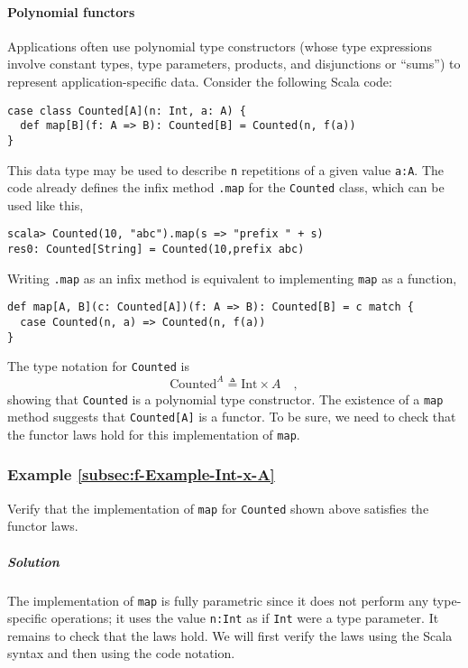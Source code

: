 \paragraph{Polynomial functors}

Applications often use polynomial type constructors
(whose type expressions involve constant types, type parameters, products,
and disjunctions or ``sums'') to represent application-specific
data. Consider the following Scala code:
\begin{lstlisting}
case class Counted[A](n: Int, a: A) {
  def map[B](f: A => B): Counted[B] = Counted(n, f(a))
}
\end{lstlisting}
This data type may be used to describe \lstinline!n! repetitions
of a given value \lstinline!a:A!. The code already defines the infix
method \lstinline!.map! for the \lstinline!Counted! class, which
can be used like this,
\begin{lstlisting}
scala> Counted(10, "abc").map(s => "prefix " + s)
res0: Counted[String] = Counted(10,prefix abc) 
\end{lstlisting}
Writing \lstinline!.map! as an infix method is equivalent to implementing
\lstinline!map! as a function,
\begin{lstlisting}
def map[A, B](c: Counted[A])(f: A => B): Counted[B] = c match {
  case Counted(n, a) => Counted(n, f(a))
}
\end{lstlisting}
The type notation for \lstinline!Counted! is
\[
\text{Counted}^{A}\triangleq\text{Int}\times A\quad,
\]
showing that \lstinline!Counted! is a polynomial
type constructor. The existence of a \lstinline!map! method suggests
that \lstinline!Counted[A]! is a functor. To be sure, we need to
check that the functor laws hold for this implementation of \lstinline!map!.

\subsubsection{Example \label{subsec:f-Example-Int-x-A}\ref{subsec:f-Example-Int-x-A}}

Verify that the implementation of \lstinline!map! for \lstinline!Counted!
shown above satisfies the functor laws. 

\subparagraph{Solution}

The implementation of \lstinline!map! is fully parametric since it
does not perform any type-specific operations; it uses the value \lstinline!n:Int!
as if \lstinline!Int! were a type parameter. It remains to check
that the laws hold. We will first verify the laws using the Scala
syntax and then using the code notation.


